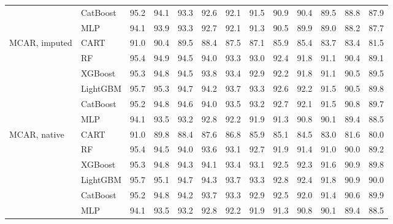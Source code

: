 \documentclass[pdflatex,sn-mathphys]{sn-jnl}
\theoremstyle{thmstyleone}
\begin{document}
\begin{table}[htbp]
\begin{tabular}{@{}llrrrrrrrrrrr@{}}
 & CatBoost & 95.2 & 94.1 & 93.3 & 92.6 & 92.1 & 91.5 & 90.9 & 90.4 & 89.5 & 88.8 & 87.9 \\
 & MLP & 94.1 & 93.9 & 93.3 & 92.7 & 92.1 & 91.3 & 90.5 & 89.9 & 89.0 & 88.2 & 87.7 \\
\midrule
MCAR, imputed & CART & 91.0 & 90.4 & 89.5 & 88.4 & 87.5 & 87.1 & 85.9 & 85.4 & 83.7 & 83.4 & 81.5 \\
 & RF & 95.4 & 94.9 & 94.5 & 94.0 & 93.3 & 93.0 & 92.4 & 91.8 & 91.1 & 90.4 & 89.1 \\
 & XGBoost & 95.3 & 94.8 & 94.5 & 93.8 & 93.4 & 92.9 & 92.2 & 91.8 & 91.1 & 90.5 & 89.5 \\
 & LightGBM & 95.7 & 95.3 & 94.7 & 94.2 & 93.7 & 93.3 & 92.6 & 92.2 & 91.5 & 90.5 & 89.8 \\
 & CatBoost & 95.2 & 94.8 & 94.6 & 94.0 & 93.5 & 93.2 & 92.7 & 92.1 & 91.5 & 90.8 & 89.7 \\
 & MLP & 94.1 & 93.5 & 93.2 & 92.8 & 92.2 & 91.9 & 91.3 & 90.8 & 90.1 & 89.4 & 88.5 \\
\midrule
MCAR, native & CART & 91.0 & 89.8 & 88.4 & 87.6 & 86.8 & 85.9 & 85.1 & 84.5 & 83.0 & 81.6 & 80.0 \\
 & RF & 95.4 & 94.5 & 94.0 & 93.6 & 93.1 & 92.7 & 91.9 & 91.4 & 91.0 & 90.0 & 89.2 \\
 & XGBoost & 95.3 & 94.8 & 94.3 & 94.1 & 93.4 & 93.1 & 92.5 & 92.3 & 91.6 & 90.9 & 89.8 \\
 & LightGBM & 95.7 & 95.1 & 94.7 & 94.3 & 93.7 & 93.3 & 92.8 & 92.4 & 91.8 & 90.9 & 90.0 \\
 & CatBoost & 95.2 & 94.8 & 94.2 & 93.7 & 93.3 & 92.9 & 92.5 & 92.0 & 91.4 & 90.6 & 89.9 \\
 & MLP & 94.1 & 93.5 & 93.2 & 92.8 & 92.2 & 91.9 & 91.3 & 90.8 & 90.1 & 89.4 & 88.5 \\
\bottomrule
\end{tabular}
\end{table}
\end{document}
